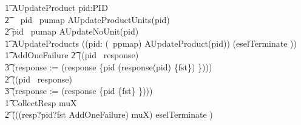 \begin{circus}
        \t1 AUpdateProduct \circdef pid:PID \circspot \\
            \t2 \,\,\,\, \lcircguard pid \in \ran~pumap \rcircguard \circguard AUpdateProductUnits(pid) \\
            \t2 \extchoice \lcircguard pid \notin \ran~pumap \rcircguard \circguard AUpdateNoUnit(pid) \\
%
        \t1 AUpdateProducts \circdef ((\Interleave pid: (\dom~ppmap) \circspot AUpdateProduct(pid)) \circseq (eselTerminate \then \Skip)) \\
%
    \t1 AddOneFailure \circdef
        \t2 (\lcircguard (pid \in \dom~response) \rcircguard \circguard \\
            \t3 (response := (response \oplus \{pid \mapsto (response(pid) \cup \{fst\}) \}))) \circseq \\
        \t2 (\lcircguard (pid \notin \dom~response)  \rcircguard \circguard \\
            \t3 (response := (response \cup \{pid \mapsto \{fst\} \})))\\
%
        \t1 CollectResp \circdef \circmu muX \circspot \\
            \t2 (((resp?pid?fst \then AddOneFailure) \circseq muX) \extchoice eselTerminate \then \Skip) \\
%

\end{circus}

